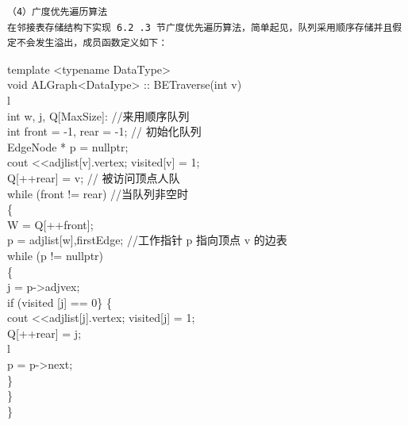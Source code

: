 \documentclass[10pt]{article}
\begin{document}
\begin{verbatim}
（4）广度优先遍历算法
在邻接表存储结构下实现 6.2 .3 节广度优先遍历算法，简单起见，队列采用顺序存储并且假定不会发生溢出，成员函数定义如下：
\end{verbatim}

template <typename DataType>\\
void ALGraph<DataIype> :: BETraverse(int v)\\
l\\[0pt]
int w, j, Q[MaxSize]: //来用顺序队列\\
int front = -1, rear = -1; // 初始化队列\\
EdgeNode * p = nullptr;\\[0pt]
cout <<adjlist[v].vertex; visited[v] = 1;\\[0pt]
Q[++rear] = v; // 被访问顶点人队\\
while (front != rear) //当队列非空时\\
\{\\[0pt]
W = Q[++front];\\[0pt]
p = adjlist[w],firstEdge; //工作指针 p 指向顶点 v 的边表\\
while (p != nullptr)\\
\{\\
j = p->adjvex;\\[0pt]
if (visited [j] == 0\} \{\\[0pt]
cout <<adjlist[j].vertex; visited[j] = 1;\\[0pt]
Q[++rear] = j;\\
l\\
p = p->next;\\
\}\\
\}\\
\}
\end{document}

